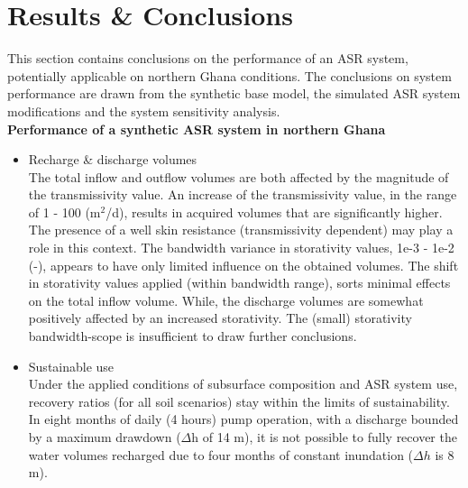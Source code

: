 \section{Results \& Conclusions}
\label{section:Upscaling_conclusions}
This section contains conclusions on the performance of an ASR system, potentially applicable on northern Ghana conditions. The conclusions on system performance are drawn from the synthetic base model, the simulated ASR system modifications and the system sensitivity analysis. \\


\textbf{Performance of a synthetic ASR system in northern Ghana}
\begin{itemize}
\item{Recharge \& discharge volumes } \\
The total inflow and outflow volumes are both affected by the magnitude of the transmissivity value. An increase of the transmissivity value, in the range of 1 - 100 (m$^2$/d), results in acquired volumes that are significantly higher. The presence of a well skin resistance (transmissivity dependent) may play a role in this context. The bandwidth variance in storativity values, 1e-3 - 1e-2 (-), appears to have only limited influence on the obtained volumes. The shift in storativity values applied (within bandwidth range), sorts minimal effects on the total inflow volume. While, the discharge volumes are somewhat positively affected by an increased storativity. The (small) storativity bandwidth-scope is insufficient to draw further conclusions. 
\item{Sustainable use} \\
Under the applied conditions of subsurface composition and ASR system use,  recovery ratios (for all soil scenarios) stay within the limits of sustainability. In eight months of daily (4 hours) pump operation, with a discharge bounded by a maximum drawdown ($\Delta$h of 14 m), it is not possible to fully recover the water volumes recharged due to four months of constant inundation ($\Delta h$ is 8 m).
\end{itemize}

